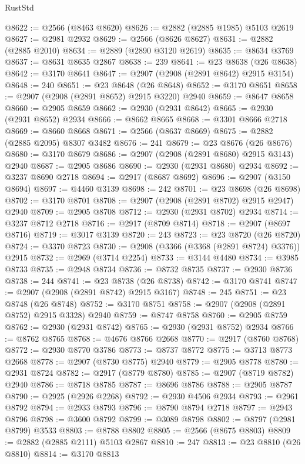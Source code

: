 \begin{lexlean}{RustStd}
\begin{coremodule}
@8622 := @2566 (@8463 @8620)
@8626 := @2882 (@2885 @1985) @5103 @2619
@8627 := @2981 @2932
@8629 := @2566 (@8626 @8627)
@8631 := @2882 (@2885 @2010)
@8634 := @2889 (@2890 @3120 @2619)
@8635 := @8634 @3769
@8637 := @8631 @8635 @2867
@8638 := 239
@8641 := @23 @8638 (@26 @8638)
@8642 := @3170 @8641
@8647 := @2907 (@2908 (@2891 @8642) @2915 @3154)
@8648 := 240
@8651 := @23 @8648 (@26 @8648)
@8652 := @3170 @8651
@8658 := @2907 (@2908 (@2891 @8652) @2915 @3220) @2940
@8659 := @8647 @8658
@8660 := @2905 @8659
@8662 := @2930 (@2931 @8642)
@8665 := @2930 (@2931 @8652) @2934
@8666 := @8662 @8665
@8668 := @3301 @8666 @2718
@8669 := @8660 @8668
@8671 := @2566 (@8637 @8669)
@8675 := @2882 (@2885 @2095) @8307 @3482
@8676 := 241
@8679 := @23 @8676 (@26 @8676)
@8680 := @3170 @8679
@8686 := @2907 (@2908 (@2891 @8680) @2915 @3143) @2940
@8687 := @2905 @8686
@8690 := @2930 (@2931 @8680) @2934
@8692 := @3237 @8690 @2718
@8694 := @2917 (@8687 @8692)
@8696 := @2907 (@3150 @8694)
@8697 := @4460 @3139
@8698 := 242
@8701 := @23 @8698 (@26 @8698)
@8702 := @3170 @8701
@8708 := @2907 (@2908 (@2891 @8702) @2915 @2947) @2940
@8709 := @2905 @8708
@8712 := @2930 (@2931 @8702) @2934
@8714 := @3237 @8712 @2718
@8716 := @2917 (@8709 @8714)
@8718 := @2907 (@8697 @8716)
@8719 := @3017 @3139
@8720 := 243
@8723 := @23 @8720 (@26 @8720)
@8724 := @3370 @8723
@8730 := @2908 (@3366 (@3368 (@2891 @8724) @3376)) @2915
@8732 := @2969 (@3714 @2254)
@8733 := @3144 @4480
@8734 := @3985 @8733
@8735 := @2948 @8734
@8736 := @8732 @8735
@8737 := @2930 @8736
@8738 := 244
@8741 := @23 @8738 (@26 @8738)
@8742 := @3170 @8741
@8747 := @2907 (@2908 (@2891 @8742) @2915 @3167)
@8748 := 245
@8751 := @23 @8748 (@26 @8748)
@8752 := @3170 @8751
@8758 := @2907 (@2908 (@2891 @8752) @2915 @3328) @2940
@8759 := @8747 @8758
@8760 := @2905 @8759
@8762 := @2930 (@2931 @8742)
@8765 := @2930 (@2931 @8752) @2934
@8766 := @8762 @8765
@8768 := @4676 @8766 @2668
@8770 := @2917 (@8760 @8768)
@8772 := @2930 @8770 @3786
@8773 := @8737 @8772
@8775 := @3713 @8773 @2668
@8778 := @2907 (@8730 @8775) @2940
@8779 := @2905 @8778
@8780 := @2931 @8724
@8782 := @2917 (@8779 @8780)
@8785 := @2907 (@8719 @8782) @2940
@8786 := @8718 @8785
@8787 := @8696 @8786
@8788 := @2905 @8787
@8790 := @2925 (@2926 @2268)
@8792 := @2930 @4506 @2934
@8793 := @2961 @8792
@8794 := @2933 @8793
@8796 := @8790 @8794 @2718
@8797 := @2943 @8796
@8798 := @3600 @8792
@8799 := @3089 @8798
@8802 := @8797 (@2981 @8799) @3533
@8803 := @8788 @8802
@8805 := @2566 (@8675 @8803)
@8809 := @2882 (@2885 @2111) @5103 @2867
@8810 := 247
@8813 := @23 @8810 (@26 @8810)
@8814 := @3170 @8813

\end{coremodule}
\end{lexlean}
